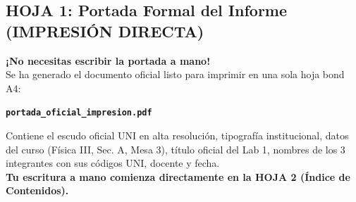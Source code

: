\documentclass[a4paper, 11pt]{article}
\begin{document}
\vspace{0.3cm}

\subsection*{\color{uni-blue} HOJA 1: Portada Formal del Informe (IMPRESIÓN DIRECTA)}
\begin{tcolorbox}[title=Instrucción de Portada: Imprimir directamente portada\_oficial\_impresion.pdf, colframe=black]
    \small
    \textbf{¡No necesitas escribir la portada a mano!} \\
    Se ha generado el documento oficial listo para imprimir en una sola hoja bond A4:
    \begin{center}
        \textbf{\large\color{uni-blue} \texttt{portada\_oficial\_impresion.pdf}}
    \end{center}
    Contiene el escudo oficial UNI en alta resolución, tipografía institucional, datos del curso (Física III, Sec. A, Mesa 3), título oficial del Lab 1, nombres de los 3 integrantes con sus códigos UNI, docente y fecha. \\
    \textbf{Tu escritura a mano comienza directamente en la HOJA 2 (Índice de Contenidos).}
\end{tcolorbox}

\newpage

\end{document}
